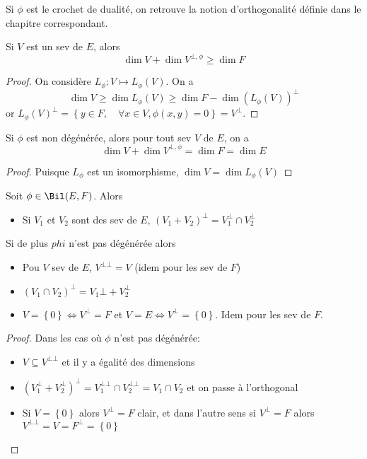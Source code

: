 \begin{rem}
Si $\phi$ est le crochet de dualité, on retrouve la notion d'orthogonalité définie dans le chapitre correspondant.
\end{rem}


\begin{prop}
Si $V$ est un sev de  $E$, alors  \[
\dim V+\dim V^{\bot, \phi}\geq \dim F
\] 
\end{prop}

\begin{proof}
    On considère $L_\phi: V\longmapsto L_\phi(V)$. On a \[\dim V\geq \dim L_\phi(V)\geq \dim F-\dim (L_\phi(V))^\bot\]
    or $L_\phi(V)^\bot=\left\{ y \in F, \quad \forall x \in  V, \phi(x, y)=0 \right\}  =V^\bot$.
\end{proof}

\begin{prop}
    Si $\phi$ est non dégénérée, alors pour tout sev  $V$ de  $E$, on a \[\dim V+\dim V^{\bot, \phi}=\dim F=\dim E\]
\end{prop}
\begin{proof}
    Puisque $L_\phi$ est un isomorphisme,  $\dim V=\dim L_\phi(V)$
\end{proof}

\begin{prop}
    Soit $\phi \in  \Bil(E, F)$. Alors \begin{itemize}
        \item Si  $V_1$ et $V_2$ sont des sev de $E$, $(V_1+V_2)^\bot=V_1^\bot\cap V_2^\bot$
    \end{itemize}
    Si  de plus $ phi$ n'est pas dégénérée alors \begin{itemize}
        \item Pou $V$ sev de $E$, $V ^{\bot\bot}=V$ (idem pour les sev de $F$)
        \item $(V_1\cap V_2)^\bot=V_1 \bot+V_2^\bot$
        \item  $V=\left\{ 0 \right\} \iff  V^\bot=F $  et $V=E \iff  V^\bot =\left\{ 0 \right\} $. Idem pour les sev de $F$.
    \end{itemize}
\end{prop}

\begin{proof}
Dans les cas où $\phi$ n'est pas dégénérée:  \begin{itemize}
    \item $V\subseteq V^{\bot\bot}$ et il y a égalité des dimensions
    \item $(V_1^\bot+V_2^\bot)^\bot=V_1^{\bot\bot}\cap V_2^{\bot\bot}=V_1\cap V_2$ et on passe à l'orthogonal
    \item Si $V = \left\{ 0 \right\} $ alors $V^\bot =F$ clair, et dans l'autre sens si  $V^\bot=F$ alors  $V^{\bot\bot}=V=F^\bot=\left\{ 0 \right\} $
\end{itemize}
\end{proof}

